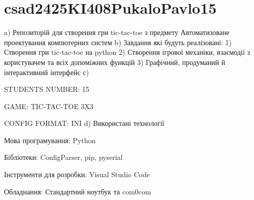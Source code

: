 \chapter{csad2425\+KI408\+Pukalo\+Pavlo15}
\hypertarget{md__r_e_a_d_m_e}{}\label{md__r_e_a_d_m_e}
\label{md__r_e_a_d_m_e_autotoc_md0}%
%


a) Репозиторій для створення гри tic-\/tac-\/toe з предмету \textquotesingle{}Автоматизоване проектування комп\textquotesingle{}ютерних систем\textquotesingle{} b) Завдання які будуть реалізовані\+: 1) Створення гри tic-\/tac-\/toe на python 2) Створення ігрової механіки, взаємодії з користувачем та всіх допоміжних функцій 3) Графічний, продуманий й інтерактивний інтерфейс с)
\begin{DoxyItemize}
\item STUDENTS NUMBER\+: 15
\item GAME\+: TIC-\/\+TAC-\/\+TOE 3X3
\item CONFIG FORMAT\+: INI d) Використані технології
\item Мова програмування\+: Python
\item Бібліотеки\+: Config\+Parser, pip, pyserial
\item Інструменти для розробки\+: Visual Studio Code
\item Обладнання\+: Стандартний ноутбук та com0com 
\end{DoxyItemize}